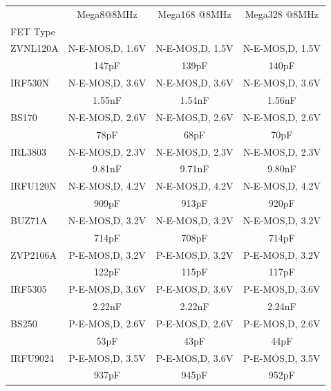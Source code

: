 \begin{table}[H]
  \begin{center}
    \begin{tabular}{| l | c | c | c |}
    \hline
    \hline
             & Mega8@8MHz       & Mega168 @8MHz    & Mega328 @8MHz \\
 FET Type     &                  &                  &               \\
    \hline
    \hline
ZVNL120A     & N-E-MOS,D, 1.6V  & N-E-MOS,D, 1.5V  & N-E-MOS,D, 1.5V \\
             & 147pF            & 139pF            & 140pF \\
    \hline
IRF530N      & N-E-MOS,D, 3.6V  & N-E-MOS,D, 3.6V  & N-E-MOS,D, 3.6V \\
             & 1.55nF           & 1.54nF           & 1.56nF \\
    \hline
BS170        & N-E-MOS,D, 2.6V  & N-E-MOS,D, 2.6V  & N-E-MOS,D, 2.6V \\
             &  78pF            &  68pF            &  70pF \\
    \hline
IRL3803      & N-E-MOS,D, 2.3V  & N-E-MOS,D, 2.3V  & N-E-MOS,D, 2.3V \\
             & 9.81nF           & 9.71nF           & 9.80nF \\
    \hline
IRFU120N     & N-E-MOS,D, 4.2V  & N-E-MOS,D, 4.2V  & N-E-MOS,D, 4.2V \\
             & 909pF            & 913pF            & 920pF \\
    \hline
BUZ71A       & N-E-MOS,D, 3.2V  & N-E-MOS,D, 3.2V  & N-E-MOS,D, 3.2V \\
             & 714pF            & 708pF            & 714pF \\
    \hline
ZVP2106A     & P-E-MOS,D, 3.2V  & P-E-MOS,D, 3.2V  & P-E-MOS,D, 3.2V \\
             & 122pF            & 115pF            & 117pF \\
    \hline
IRF5305      & P-E-MOS,D, 3.6V  & P-E-MOS,D, 3.6V  & P-E-MOS,D, 3.6V \\
             & 2.22nF           & 2.22nF           & 2.24nF \\
    \hline
BS250        & P-E-MOS,D, 2.6V  & P-E-MOS,D, 2.6V  & P-E-MOS,D, 2.6V \\
             & 53pF             & 43pF             & 44pF \\
    \hline
IRFU9024     & P-E-MOS,D, 3.5V  & P-E-MOS,D, 3.6V  & P-E-MOS,D, 3.5V \\
             & 937pF            & 945pF            & 952pF \\

\end{tabular}
\end{center}
\end{table}
